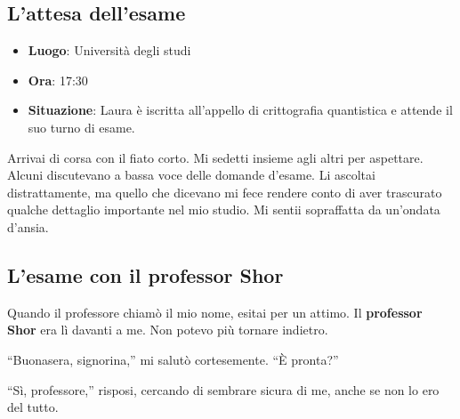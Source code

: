 \subsection{L'attesa dell'esame}
\begin{tcolorbox}[colback=gray!5,colframe=gray!80,title=\textbf{Scheda Informativa}]
\begin{itemize}
    \item \textbf{Luogo}: Università degli studi
    \item \textbf{Ora}: 17:30
    \item \textbf{Situazione}: Laura è iscritta all'appello di crittografia quantistica e attende il suo turno di esame.
\end{itemize}
\end{tcolorbox}

Arrivai di corsa con il fiato corto. Mi sedetti  insieme agli altri per aspettare. Alcuni discutevano a bassa voce delle domande d’esame. Li ascoltai distrattamente, ma quello che dicevano mi fece rendere conto di aver trascurato qualche dettaglio importante nel mio studio. Mi sentii sopraffatta da un’ondata d'ansia.

\subsection{L'esame con il professor Shor}
Quando il professore chiamò il mio nome, esitai per un attimo. Il \textbf{professor Shor} era lì davanti a me. Non potevo più tornare indietro.

\begin{dialogue}
 \enquote{Buonasera, signorina,} mi salutò cortesemente. \enquote{È pronta?}
\end{dialogue}

\begin{dialogue}
 \enquote{Sì, professore,} risposi, cercando di sembrare sicura di me, anche se non lo ero del tutto.
\end{dialogue}

